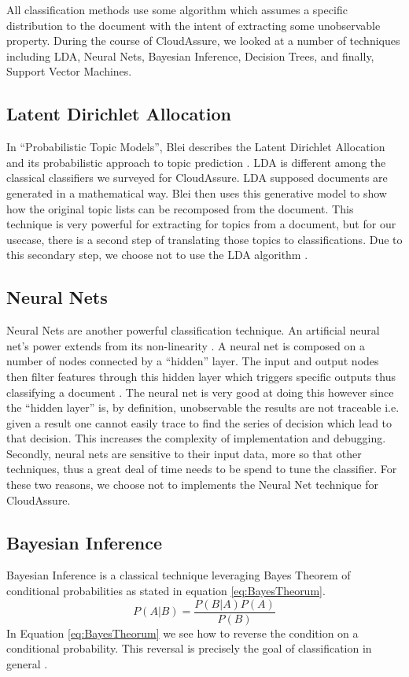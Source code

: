 All classification methods use some algorithm which assumes a specific
distribution to the document with the intent of extracting some unobservable
property. During the course of CloudAssure, we looked at a number of techniques
including \gls{LDA}, Neural Nets, Bayesian Inference, Decision Trees, and finally,
Support Vector Machines.

\subsection{Latent Dirichlet Allocation}
In ``Probabilistic Topic Models'', Blei describes the Latent Dirichlet
Allocation and its probabilistic approach to topic prediction
\autocite{Blei2012}. \gls{LDA} is different among the classical classifiers we
surveyed for CloudAssure. \gls{LDA} supposed documents are generated in
a mathematical way. Blei then uses this generative model to show how the original topic lists can be
recomposed from the document. This technique is very powerful for extracting for
topics from a document, but for our usecase, there is a second step of
translating those topics to classifications. Due to this secondary step, we
choose not to use the LDA algorithm \autocite{RadimRehurek2010}.

\subsection{Neural Nets}
Neural Nets are another powerful classification technique. An artificial neural
net's power
extends from its non-linearity \autocite{Zhang2000}. A neural net is composed on
a number of nodes connected by a ``hidden'' layer. The input and output nodes
then filter features through this hidden layer which triggers specific outputs
thus classifying a document \autocite{Merkl}. The neural net is very good at
doing this however since the ``hidden layer'' is, by definition, unobservable
the results are not traceable i.e. given a result one cannot easily trace to
find the series of decision which lead to that decision. This increases the
complexity of implementation and debugging. Secondly, neural nets are sensitive
to their input data, more so that other techniques, thus a great deal of time
needs to be spend to tune the classifier. For these two reasons, we choose not
to implements the Neural Net technique for CloudAssure. 

\subsection{Bayesian Inference}
Bayesian Inference is a classical technique leveraging Bayes Theorem of
conditional probabilities as stated in equation \ref{eq:BayesTheorum}.
\begin{equation}
    P(A|B) = \frac{P(B | A) P(A)}{P(B)}
    \label{eq:BayesTheorum}
\end{equation}
In Equation \ref{eq:BayesTheorum} we see how to reverse the condition on a conditional probability.
This reversal is precisely the goal of classification in general \autocite{Bishop2009}.

